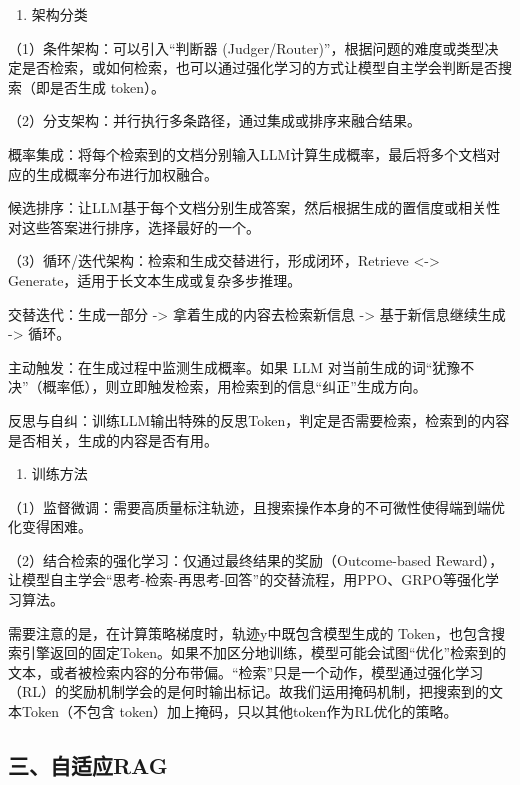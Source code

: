 \begin{enumerate}
\def\labelenumi{\arabic{enumi}.}
\tightlist
\item
  架构分类
\end{enumerate}

（1）条件架构：可以引入``判断器 (Judger/Router)''，根据问题的难度或类型决定是否检索，或如何检索，也可以通过强化学习的方式让模型自主学会判断是否搜索（即是否生成 token）。

（2）分支架构：并行执行多条路径，通过集成或排序来融合结果。

概率集成：将每个检索到的文档分别输入LLM计算生成概率，最后将多个文档对应的生成概率分布进行加权融合。

候选排序：让LLM基于每个文档分别生成答案，然后根据生成的置信度或相关性对这些答案进行排序，选择最好的一个。

（3）循环/迭代架构：检索和生成交替进行，形成闭环，Retrieve \textless-\textgreater{} Generate，适用于长文本生成或复杂多步推理。

交替迭代：生成一部分 -\textgreater{} 拿着生成的内容去检索新信息 -\textgreater{} 基于新信息继续生成 -\textgreater{} 循环。

主动触发：在生成过程中监测生成概率。如果 LLM 对当前生成的词``犹豫不决''（概率低），则立即触发检索，用检索到的信息``纠正''生成方向。

反思与自纠：训练LLM输出特殊的反思Token，判定是否需要检索，检索到的内容是否相关，生成的内容是否有用。

\begin{enumerate}
\def\labelenumi{\arabic{enumi}.}
\setcounter{enumi}{1}
\tightlist
\item
  训练方法
\end{enumerate}

（1）监督微调：需要高质量标注轨迹，且搜索操作本身的不可微性使得端到端优化变得困难。

（2）结合检索的强化学习：仅通过最终结果的奖励（Outcome-based Reward），让模型自主学会``思考-检索-再思考-回答''的交替流程，用PPO、GRPO等强化学习算法。

需要注意的是，在计算策略梯度时，轨迹y中既包含模型生成的 Token，也包含搜索引擎返回的固定Token。如果不加区分地训练，模型可能会试图``优化''检索到的文本，或者被检索内容的分布带偏。``检索''只是一个动作，模型通过强化学习（RL）的奖励机制学会的是何时输出标记。故我们运用掩码机制，把搜索到的文本Token（不包含 token）加上掩码，只以其他token作为RL优化的策略。

\hypertarget{ux4e09ux81eaux9002ux5e94rag}{%
\subsection{三、自适应RAG}\label{ux4e09ux81eaux9002ux5e94rag}}

